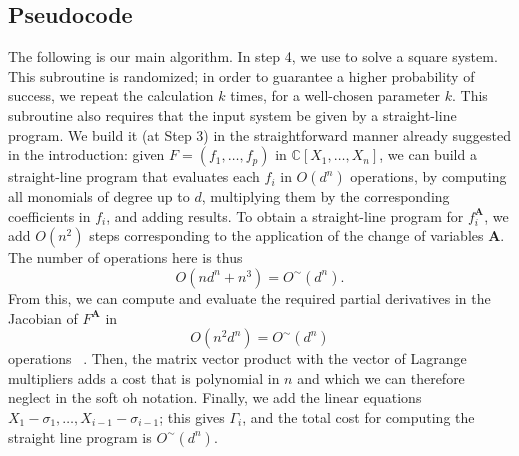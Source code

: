\documentclass[12pt]{article}
\def\mA{{\bm A}}
\def\C{\mathbb{C}}
\begin{document}
\subsection{Pseudocode}
%
The following is our main algorithm. In step 4, we use \cite[Algorithm 2]{SH} to solve a square
system. This subroutine is randomized; in order to guarantee a higher
probability of success, we repeat the calculation $k$ times, for a
well-chosen parameter $k$. This subroutine also requires that the input system be given by a
straight-line program. We build it (at Step 3) in the straightforward
manner already suggested in the introduction: given $F=(f_1,\hdots,f_p)$ in $\C[X_1,\hdots,X_n]$, we can build
a straight-line program that evaluates each $f_i$ in $O(d^n)$ operations, by
computing all monomials of degree up to $d$, multiplying them by the
corresponding coefficients in $f_i$, and adding results. To obtain a
straight-line program for $f_i^\mA$, we add $O(n^2)$ steps corresponding
to the application of the change of variables $\mA$. The number of operations here is thus
\[
O(nd^n + n^3) = O^{\sim}(d^n).
\]
From this, we can compute and evaluate the required partial derivatives in the Jacobian of $F^\mA$ in
\[
O(n^2d^n) = O^{\sim}(d^n)
\]
operations ~\cite{BaSt83}.
Then, the matrix vector product with the vector of Lagrange multipliers adds a cost that is polynomial in $n$ and which we can therefore neglect in the soft oh notation. Finally, we add the linear equations
$X_1-\sigma_1,\hdots,X_{i-1}-\sigma_{i-1}$; this gives $\Gamma_i$, and the total cost for computing the straight line program is $O^{\sim}(d^n).$
\end{document}
